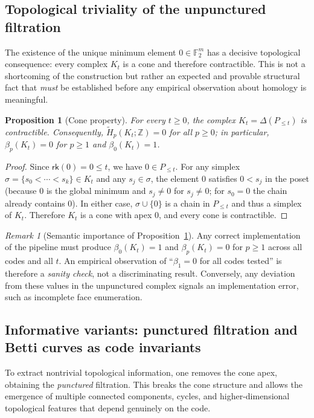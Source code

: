 \documentclass[11pt,twoside,leqno]{article}
\theoremstyle{definition}
\theoremstyle{plain}
\newtheorem{proposition}[definition]{Proposition}
\theoremstyle{remark}
\newtheorem{remark}[definition]{Remark}
\newcommand{\Ftwo}{\mathbb{F}_2}
\newcommand{\rk}{\mathsf{rk}}
\begin{document}
\subsection{Topological triviality of the unpunctured filtration}\label{sec:trivial}

The existence of the unique minimum element $0\in\Ftwo^m$ has a decisive topological consequence:
every complex $K_t$ is a cone and therefore contractible. This is not a shortcoming of the construction
but rather an expected and provable structural fact that \emph{must} be established before any empirical
observation about homology is meaningful.

\begin{proposition}[Cone property]\label{prop:cone}
For every $t\ge 0$, the complex $K_t=\Delta(P_{\le t})$ is contractible.
Consequently, $\widetilde{H}_p(K_t;\mathbb{Z})=0$ for all $p\ge 0$; in particular,
$\beta_p(K_t)=0$ for $p\ge 1$ and $\beta_0(K_t)=1$.
\end{proposition}

\begin{proof}
Since $\rk(0)=0\le t$, we have $0\in P_{\le t}$. For any simplex $\sigma=\{s_0<\cdots<s_k\}\in K_t$
and any $s_j\in\sigma$, the element $0$ satisfies $0<s_j$ in the poset (because $0$ is the global
minimum and $s_j\ne 0$ for $s_j\ne 0$; for $s_0=0$ the chain already contains $0$). In either case,
$\sigma\cup\{0\}$ is a chain in $P_{\le t}$ and thus a simplex of $K_t$. Therefore $K_t$ is a cone
with apex $0$, and every cone is contractible.
\end{proof}

\begin{remark}[Semantic importance of Proposition~\ref{prop:cone}]
Any correct implementation of the pipeline must produce $\beta_0(K_t)=1$ and $\beta_p(K_t)=0$ for
$p\ge 1$ across all codes and all $t$. An empirical observation of ``$\beta_1=0$ for all codes tested''
is therefore a \emph{sanity check}, not a discriminating result. Conversely, any deviation from these
values in the unpunctured complex signals an implementation error, such as incomplete face enumeration.
\end{remark}

\subsection{Informative variants: punctured filtration and Betti curves as code invariants}
\label{sec:informative}

To extract nontrivial topological information, one removes the cone apex, obtaining the \emph{punctured}
filtration. This breaks the cone structure and allows the emergence of multiple connected components,
cycles, and higher-dimensional topological features that depend genuinely on the code.
\end{document}
